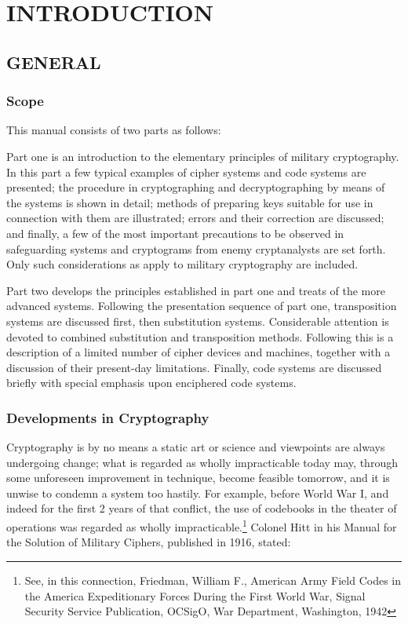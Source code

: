 
\chapter{INTRODUCTION}
 
\section{GENERAL}

\subsection{Scope}

This manual consists of two parts as follows:

\mypara Part one is an introduction to the elementary principles of military
cryptography. In this part a few typical examples of cipher systems and
code systems are presented; the procedure in cryptographing and decryptographing by means of the systems is shown in detail; methods of preparing keys suitable for use in connection with them are illustrated;
errors and their correction are discussed; and ﬁnally, a few of the most
important precautions to be observed in safeguarding systems and
cryptograms from enemy cryptanalysts are set forth. Only such considerations as apply to military cryptography are included.

\mypara Part two develops the principles established in part one and treats
of the more advanced systems. Following the presentation sequence of
part one, transposition systems are discussed ﬁrst, then substitution
systems. Considerable attention is devoted to combined substitution and
transposition methods. Following this is a description of a limited number
of cipher devices and machines, together with a discussion of their
present-day limitations. Finally, code systems are discussed brieﬂy with
special emphasis upon enciphered code systems.

\subsection{Developments in Cryptography}

\mypara Cryptography is by no means a static art or science and viewpoints
are always undergoing change; what is regarded as wholly impracticable
today may, through some unforeseen improvement in technique, become
feasible tomorrow, and it is unwise to condemn a system too hastily.
For example, before World War I, and indeed for the ﬁrst 2 years of
that conﬂict, the use of codebooks in the theater of operations was
regarded as wholly impracticable.\footnote{See, in this connection, Friedman, William F., American Army Field Codes in the America Expeditionary Forces During the First World War, Signal Security Service Publication, OCSigO, War Department, Washington, 1942} Colonel Hitt in his Manual for the Solution of Military Ciphers, published in 1916, stated:

